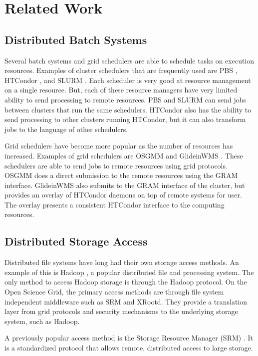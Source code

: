 \chapter{Related Work}
\label{chapter:relatedwork}

\section{Distributed Batch Systems}

Several batch systems and grid schedulers are able to schedule tasks on execution resources.  Examples of cluster schedulers that are frequently used are PBS \cite{pbstorque}, HTCondor \cite{litzkow1988condor}, and SLURM \cite{yoo2003slurm}.  Each scheduler is very good at resource management on a single resource.  But, each of these resource managers have very limited ability to send processing to remote resources.  PBS and SLURM can send jobs between clusters that run the same schedulers.  HTCondor also has the ability to send processing to other clusters running HTCondor, but it can also transform jobs to the language of other schedulers.

Grid schedulers have become more popular as the number of resources has increased.  Examples of grid schedulers are OSGMM \cite{website:osgmm} and GlideinWMS \cite{sfiligoi2008glideinwms}.  These schedulers are able to send jobs to remote resources using grid protocols.  OSGMM does a direct submission to the remote resources using the GRAM interface.  GlideinWMS also submits to the GRAM interface of the cluster, but provides an overlay of HTCondor daemons on top of remote systems for user.  The overlay presents a consistent HTCondor interface to the computing resources.  


\section{Distributed Storage Access}

Distributed file systems have long had their own storage access methods.  An example of this is Hadoop \cite{white2012hadoop}, a popular distributed file and processing system.  The only method to access Hadoop storage is through the Hadoop protocol.  On the Open Science Grid, the primary access methods are through file system independent middleware such as SRM and XRootd.  They provide a translation layer from grid protocols and security mechanisms to the underlying storage system, such as Hadoop.


A previously popular access method is the Storage Resource Manager (SRM) \cite{shoshani2002storage}.  It is a standardized protocol that allows remote, distributed access to large storage.  


